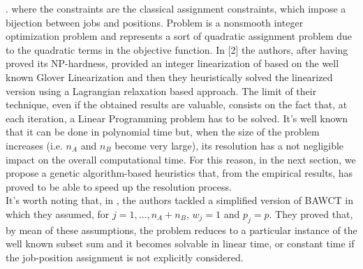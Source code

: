 \documentclass[opre,nonblindrev]{informs3} %
\begin{document}
\ea
\right.
\ee
where the constraints are the classical assignment constraints, which impose a bijection between jobs and positions. 
Problem  is a nonsmooth integer optimization problem and represents a sort of quadratic assignment problem due to the quadratic terms in the objective function. In [2] the authors, after having proved its NP-hardness, provided an integer linearization of  based on the well known Glover Linearization and then they heuristically solved the linearized version using a Lagrangian relaxation based approach. The limit of their technique, even if the obtained results are valuable, consists on the fact that, at each iteration, a Linear Programming problem has to be solved. It's well known that it can be done in polynomial time but, when the size of the problem increases (i.e. $n_A$ and $n_B$ become very large), its resolution has a not negligible impact on the overall computational time. For this reason, in the next section, we propose a genetic algorithm-based heuristics that, from the empirical results, has proved to be able to speed up the resolution process.\\
It's worth noting that, in \cite{av-fud20}, the authors tackled a simplified version of BAWCT in which they assumed, for $j=1,\ldots,n_A+n_B$, $w_j=1$ and $p_j=p$. They proved that, by mean of these assumptions, the problem reduces to a particular instance of the well known subset sum and it becomes solvable in linear time, or constant time if the job-position assignment is not explicitly considered.
\end{document}

